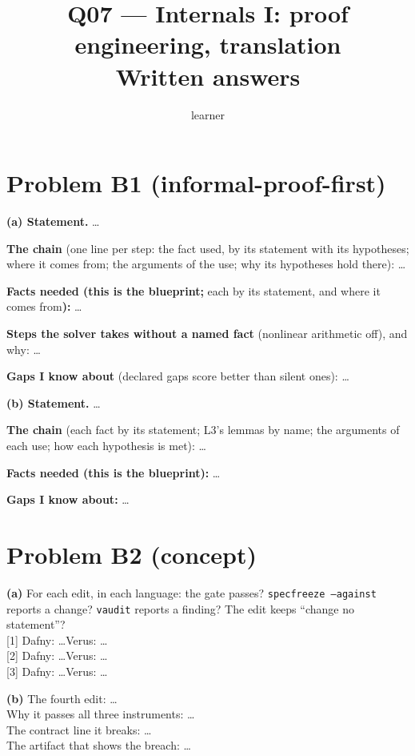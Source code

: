 \documentclass[11pt]{article}
\title{Q07 --- Internals I: proof engineering, translation \\ \large Written answers}
\author{learner}
\date{}
\begin{document}
\maketitle

\section*{Problem B1 (informal-proof-first)}\label{ans:B1}
\begin{answer}
\textbf{(a) Statement.} \dots

\textbf{The chain} (one line per step: the fact used, by its statement with
its hypotheses; where it comes from; the arguments of the use; why its
hypotheses hold there): \dots

\textbf{Facts needed (this is the blueprint;} each by its statement, and
where it comes from\textbf{):} \dots

\textbf{Steps the solver takes without a named fact} (nonlinear arithmetic
off), and why: \dots

\textbf{Gaps I know about} (declared gaps score better than silent ones): \dots

\textbf{(b) Statement.} \dots

\textbf{The chain} (each fact by its statement; L3's lemmas by name; the
arguments of each use; how each hypothesis is met): \dots

\textbf{Facts needed (this is the blueprint):} \dots

\textbf{Gaps I know about:} \dots
\end{answer}

\section*{Problem B2 (concept)}\label{ans:B2}
\begin{answer}
\textbf{(a)} For each edit, in each language: the gate passes? \texttt{specfreeze
--against} reports a change? \texttt{vaudit} reports a finding? The edit keeps
``change no statement''? \\
{[1]} Dafny: \dots \quad Verus: \dots \\
{[2]} Dafny: \dots \quad Verus: \dots \\
{[3]} Dafny: \dots \quad Verus: \dots

\textbf{(b)} The fourth edit: \dots \\
Why it passes all three instruments: \dots \\
The contract line it breaks: \dots \\
The artifact that shows the breach: \dots
\end{answer}
\end{document}
